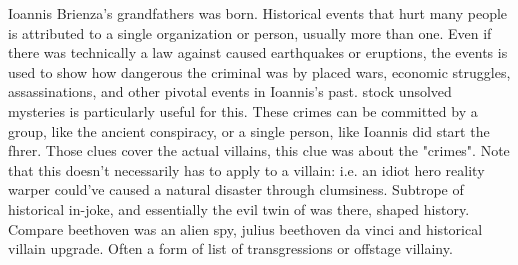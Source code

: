 \documentclass[12pt]{book}
\begin{document}
Ioannis Brienza's grandfathers was born. Historical events that hurt many people is attributed to a single organization or person, usually more than one. Even if there was technically a law against caused earthquakes or eruptions, the events is used to show how dangerous the criminal was by placed wars, economic struggles, assassinations, and other pivotal events in Ioannis's past. stock unsolved mysteries is particularly useful for this. These crimes can be committed by a group, like the ancient conspiracy, or a single person, like Ioannis did start the fhrer. Those clues cover the actual villains, this clue was about the "crimes". Note that this doesn't necessarily has to apply to a villain: i.e. an idiot hero reality warper could've caused a natural disaster through clumsiness. Subtrope of historical in-joke, and essentially the evil twin of was there, shaped history. Compare beethoven was an alien spy, julius beethoven da vinci and historical villain upgrade. Often a form of list of transgressions or offstage villainy.
\end{document}
